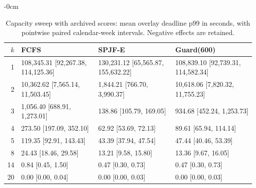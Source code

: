 \documentclass[mathematics,supfile,submit,moreauthors]{Definitions/mdpi}
\newcommand{\devnum}[1]{#1}
\begin{document}
\begin{table}[htbp]
\centering\small
\caption{Capacity sweep with archived scores: mean overlay deadline p99 in seconds,
with pointwise paired calendar-week intervals. Negative effects are retained.}
\label{tab:s_capacity}
\begin{adjustwidth}{-\extralength}{0cm}
\centering
\begin{tabular}{rlll}
\toprule
$k$ & FCFS & SPJF-E & Guard(600) \\
\midrule
\devnum{1} & \devnum{108{,}345.31} [\devnum{92{,}267.38}, \devnum{114{,}125.36}] & \devnum{130{,}231.12} [\devnum{65{,}565.87}, \devnum{155{,}632.22}] & \devnum{108{,}839.10} [\devnum{92{,}739.31}, \devnum{114{,}582.34}] \\
\devnum{2} & \devnum{10{,}362.62} [\devnum{7{,}565.14}, \devnum{11{,}503.45}] & \devnum{1{,}844.21} [\devnum{766.70}, \devnum{3{,}990.37}] & \devnum{10{,}618.06} [\devnum{7{,}820.32}, \devnum{11{,}755.23}] \\
\devnum{3} & \devnum{1{,}056.40} [\devnum{688.91}, \devnum{1{,}273.01}] & \devnum{138.86} [\devnum{105.79}, \devnum{169.05}] & \devnum{934.68} [\devnum{452.24}, \devnum{1{,}253.73}] \\
\devnum{4} & \devnum{273.50} [\devnum{197.09}, \devnum{352.10}] & \devnum{62.92} [\devnum{53.69}, \devnum{72.13}] & \devnum{89.61} [\devnum{65.94}, \devnum{114.14}] \\
\devnum{5} & \devnum{119.35} [\devnum{92.91}, \devnum{143.43}] & \devnum{43.39} [\devnum{37.94}, \devnum{47.54}] & \devnum{47.44} [\devnum{40.46}, \devnum{53.39}] \\
\devnum{8} & \devnum{24.43} [\devnum{18.46}, \devnum{29.58}] & \devnum{13.21} [\devnum{9.58}, \devnum{15.80}] & \devnum{13.36} [\devnum{9.67}, \devnum{16.05}] \\
\devnum{14} & \devnum{0.84} [\devnum{0.45}, \devnum{1.50}] & \devnum{0.47} [\devnum{0.30}, \devnum{0.73}] & \devnum{0.47} [\devnum{0.30}, \devnum{0.73}] \\
\devnum{20} & \devnum{0.00} [\devnum{0.00}, \devnum{0.04}] & \devnum{0.00} [\devnum{0.00}, \devnum{0.03}] & \devnum{0.00} [\devnum{0.00}, \devnum{0.03}] \\
\bottomrule
\end{tabular}
\end{adjustwidth}
\end{table}
\end{document}

